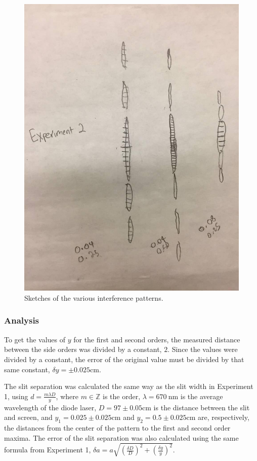 \documentclass[12pt]{article}
\begin{document}
\begin{figure}[H]
  \label{pic:exp2}
  \begin{center}
    \includegraphics[scale=0.4]{exp2.jpg}
  \end{center}
  \caption{Sketches of the various interference patterns.}
\end{figure}

\subsubsection{Analysis}

\qq To get the values of \(y\) for the first and second orders, the measured
distance between the side orders was divided by a constant, \(2\). Since the
values were divided by a constant, the error of the original value must be
divided by that same constant, \(\delta y = \pm 0.025 \si{\centi\meter}\).

\qq The slit separation was calculated the same way as the slit width in
Experiment 1, using \(d = \frac{m \lambda D}{y}\), where \(m \in \mathbb{Z}\) is
the order, \(\lambda = \SI{670}{\nano\meter}\) is the average wavelength of the
diode laser, \(D = 97 \pm 0.05\si{\centi\meter}\) is the distance between the
slit and screen, and \(y_1 = 0.025 \pm 0.025 \si{\centi\meter}\) and
\(y_2 = 0.5 \pm 0.025 \si{\centi\meter}\) are, respectively, the distances from
the center of the pattern to the first and second order maxima. The error of the
slit separation was also calculated using the same formula from Experiment 1, 
\(\delta a = a \sqrt{\left( \frac{\delta D}{D} \right) ^2 + \left( \frac{\delta
y}{y} \right) ^2 } \).
\end{document}
